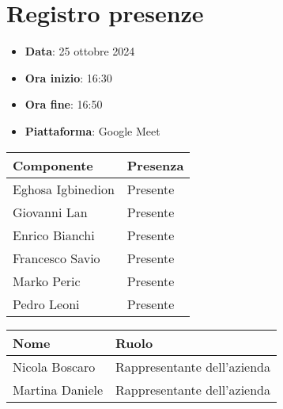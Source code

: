 \documentclass[a4paper, 12pt]{article}
\begin{document}
\section{Registro presenze}
\begin{itemize}
    \item[] \textbf{Data}: 25 ottobre 2024
    \item[] \textbf{Ora inizio}:  16:30
    \item[] \textbf{Ora fine}: 16:50
    \item[] \textbf{Piattaforma}: Google Meet	
\end{itemize}
\begin{table}[!h]
\centering
{\renewcommand{\arraystretch}{2}
\begin{tabularx}{\textwidth}{| X | X |}
    \hline
        \textbf{\large Componente} & 
        \textbf{\large Presenza} \\ 
    \hline 
    \hline
        Eghosa Igbinedion&
        Presente \\
    \hline 
        Giovanni Lan&
        Presente \\
    \hline 
        Enrico Bianchi&
        Presente \\
    \hline 
        Francesco Savio&
        Presente \\
    \hline 
        Marko Peric&
        Presente \\
    \hline 
        Pedro Leoni&
        Presente \\
    \hline 

\end{tabularx}}
\end{table}

\begin{table}[!h]
    \centering
    {\renewcommand{\arraystretch}{2}
    \begin{tabularx}{\textwidth}{| X | X |}
        \hline
            \textbf{\large Nome} & 
            \textbf{\large Ruolo} \\ 
        \hline 
        \hline
            Nicola Boscaro&
            Rappresentante dell'azienda \\
        \hline 
            Martina Daniele&
            Rappresentante dell'azienda \\
        \hline 
    
    \end{tabularx}}
\end{table}

\newpage
\end{document}
